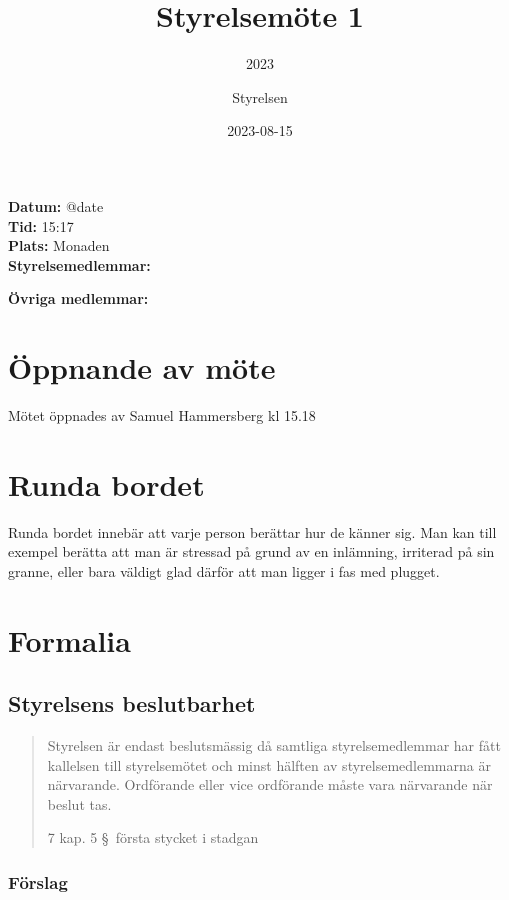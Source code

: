 \documentclass[protokoll]{dvd}
\begin{document}
\title{Styrelsemöte 1}
\subtitle{2023}
\author{Styrelsen}
\date{2023-08-15}

\textbf{Datum:} \csname @date\endcsname\\
\textbf{Tid:} 15:17\\
\textbf{Plats:} Monaden\\
\textbf{Styrelsemedlemmar:}
\begin{närvarande_förtroendevalda}
\end{närvarande_förtroendevalda}

\textbf{Övriga medlemmar:} \\


\section{Öppnande av möte}

Mötet öppnades av Samuel Hammersberg kl 15.18

\section{Runda bordet}

Runda bordet innebär att varje person berättar hur de känner sig.
Man kan till exempel berätta att man är stressad på grund av en inlämning, irriterad på sin granne, eller bara väldigt glad därför att man ligger i fas med plugget.

\section{Formalia}

\subsection{Styrelsens beslutbarhet}

\blockquote[7 kap. 5 \S~första stycket i stadgan][]{%
    Styrelsen är endast beslutsmässig då samtliga styrelsemedlemmar har fått kallelsen till styrelsemötet och minst hälften av styrelsemedlemmarna är närvarande.
    Ordförande eller vice ordförande måste vara närvarande när beslut tas.
}

\subsubsection*{Förslag}
\end{document}
